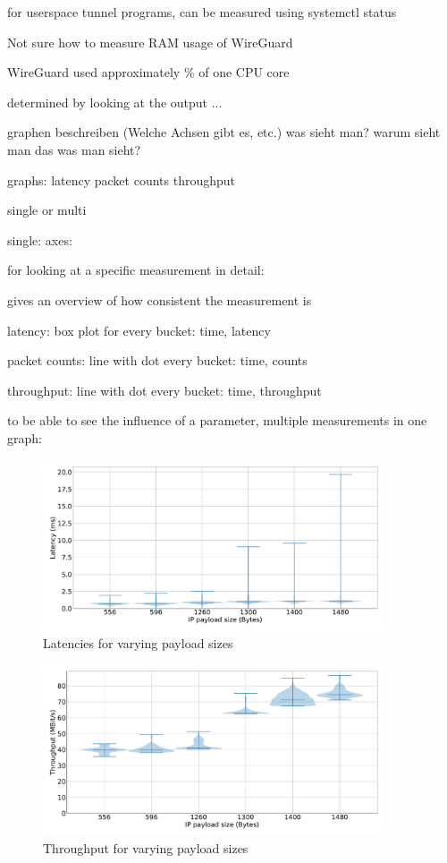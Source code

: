 for userspace tunnel programs, can be measured using systemctl status

Not sure how to measure RAM usage of WireGuard

WireGuard used approximately \% of one CPU core

determined by looking at the output ...


graphen beschreiben (Welche Achsen gibt es, etc.)
was sieht man?
warum sieht man das was man sieht?


graphs:
latency
packet counts
throughput

single or multi

single: axes:

for looking at a specific measurement in detail:

gives an overview of how consistent the measurement is

latency: box plot for every bucket: time, latency

packet counts: line with dot every bucket: time, counts

throughput: line with dot every bucket: time, throughput


to be able to see the influence of a parameter, multiple measurements in one graph:

\begin{figure}[tbh]
	\centering
	\includegraphics[draft=false,width=0.9\textwidth]{figures/Graphs/graph-1-mtu/latencies.pdf}
	\caption{Latencies for varying payload sizes}\label{fix:graph-1-mtu-latencies}
\end{figure}
\begin{figure}[tbh]
	\centering
	\includegraphics[draft=false,width=0.9\textwidth]{figures/Graphs/graph-1-mtu/throughput.pdf}
	\caption{Throughput for varying payload sizes}\label{fix:graph-1-mtu-throughput}
\end{figure}

